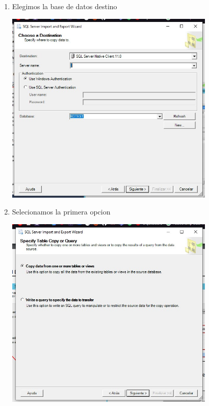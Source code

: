 \begin{enumerate}
        \newpage
        
     \item Elegimos la base de datos destino
        \begin{center}
             \includegraphics[width=10cm]{imagenes/importa_data_3.jpg}
        \end{center}
        
     \item Selecionamos la primera opcion
        \begin{center}
             \includegraphics[width=10cm]{imagenes/importa_data_4.jpg}
        \end{center}
        \newpage
        

\end{enumerate}
